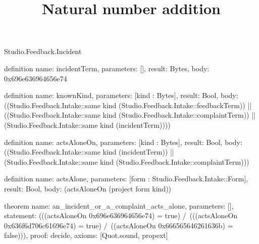 \begin{lexlean}{Studio.Feedback.Incident}
\title{Natural number addition}
\begin{semanticmodule}
definition{
  name: incidentTerm,
  parameters: [],
  result: Bytes,
  body: 0x696e636964656e74
}

definition{
  name: knownKind,
  parameters: [kind : Bytes],
  result: Bool,
  body: ((Studio.Feedback.Intake::same kind (Studio.Feedback.Intake::feedbackTerm)) || ((Studio.Feedback.Intake::same kind (Studio.Feedback.Intake::complaintTerm)) || (Studio.Feedback.Intake::same kind (incidentTerm))))
}

definition{
  name: actsAloneOn,
  parameters: [kind : Bytes],
  result: Bool,
  body: ((Studio.Feedback.Intake::same kind (incidentTerm)) || (Studio.Feedback.Intake::same kind (Studio.Feedback.Intake::complaintTerm)))
}

definition{
  name: actsAlone,
  parameters: [form : Studio.Feedback.Intake::Form],
  result: Bool,
  body: (actsAloneOn (project form kind))
}

theorem{
  name: an_incident_or_a_complaint_acts_alone,
  parameters: [],
  statement: (((actsAloneOn 0x696e636964656e74) = true) /\ (((actsAloneOn 0x636f6d706c61696e74) = true) /\ ((actsAloneOn 0x666565646261636b) = false))),
  proof: decide{},
  axioms: [Quot.sound, propext]
}
\end{semanticmodule}
\end{lexlean}
